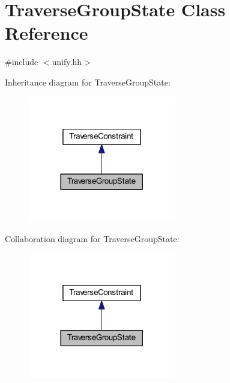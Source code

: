 \hypertarget{class_traverse_group_state}{}\section{Traverse\+Group\+State Class Reference}
\label{class_traverse_group_state}


{\ttfamily \#include $<$unify.\+hh$>$}



Inheritance diagram for Traverse\+Group\+State\+:
\nopagebreak
\begin{figure}[H]
\begin{center}
\leavevmode
\includegraphics[width=182pt]{class_traverse_group_state__inherit__graph}
\end{center}
\end{figure}


Collaboration diagram for Traverse\+Group\+State\+:
\nopagebreak
\begin{figure}[H]
\begin{center}
\leavevmode
\includegraphics[width=182pt]{class_traverse_group_state__coll__graph}
\end{center}
\end{figure}
